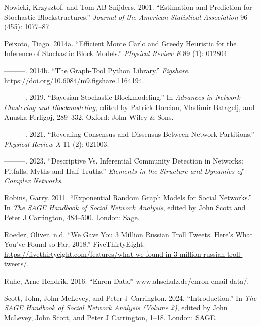 \documentclass[
  12pt,
  a4paper,
  DIV=11,
  numbers=noendperiod,
  twoside,
  open=any]{scrartcl}
\newlength{\cslhangindent}
\newenvironment{CSLReferences}[2] %
 {\begin{list}{}{%
  \setlength{\itemindent}{0pt}
  \setlength{\leftmargin}{0pt}
  \setlength{\parsep}{0pt}
  \ifodd #1
   \setlength{\leftmargin}{\cslhangindent}
   \setlength{\itemindent}{-1\cslhangindent}
  \fi
  \setlength{\itemsep}{#2\baselineskip}}}
 {\end{list}}
\begin{document}
\begin{CSLReferences}{1}{0}
Nowicki, Krzysztof, and Tom AB Snijders. 2001. {``Estimation and
Prediction for Stochastic Blockstructures.''} \emph{Journal of the
American Statistical Association} 96 (455): 1077--87.

Peixoto, Tiago. 2014a. {``Efficient Monte Carlo and Greedy Heuristic for
the Inference of Stochastic Block Models.''} \emph{Physical Review E} 89
(1): 012804.

---------. 2014b. {``The Graph-Tool Python Library.''} \emph{Figshare}.
\url{https://doi.org/10.6084/m9.figshare.1164194}.

---------. 2019. {``Bayesian Stochastic Blockmodeling.''} In
\emph{Advances in Network Clustering and Blockmodeling}, edited by
Patrick Doreian, Vladimir Batagelj, and Anuska Ferligoj, 289--332.
Oxford: John Wiley \& Sons.

---------. 2021. {``Revealing Consensus and Dissensus Between Network
Partitions.''} \emph{Physical Review X} 11 (2): 021003.

---------. 2023. {``Descriptive Vs. Inferential Community Detection in
Networks: Pitfalls, Myths and Half-Truths.''} \emph{Elements in the
Structure and Dynamics of Complex Networks}.

Robins, Garry. 2011. {``Exponential Random Graph Models for Social
Networks.''} In \emph{The SAGE Handbook of Social Network Analysis},
edited by John Scott and Peter J Carrington, 484--500. London: Sage.

Roeder, Oliver. n.d. {``We Gave You 3 Million Russian Troll Tweets.
Here's What You've Found so Far, 2018.''} FiveThirtyEight.
\url{https://fivethirtyeight.com/features/what-we-found-in-3-million-russian-troll-tweets/}.

Ruhe, Arne Hendrik. 2016. {``Enron Data.''}
www.ahschulz.de/enron-email-data/.

Scott, John, John McLevey, and Peter J Carrington. 2024.
{``Introduction.''} In \emph{The SAGE Handbook of Social Network
Analysis (Volume 2)}, edited by John McLevey, John Scott, and Peter J
Carrington, 1--18. London: SAGE.


\end{CSLReferences}
\end{document}
